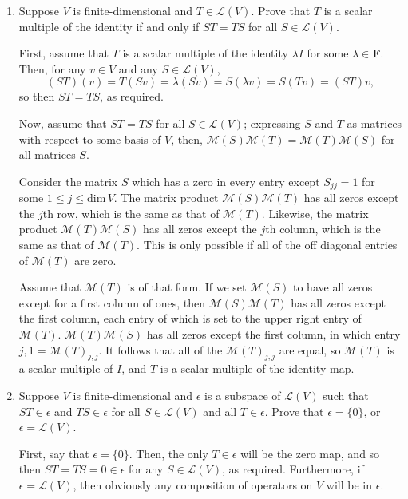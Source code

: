 \documentclass{book}
\begin{document}
\begin{enumerate}
\item Suppose \(V\) is finite-dimensional and \(T \in \mathcal{L}(V)\).  Prove that \(T\) is a scalar multiple of the identity if and only if \(ST=TS\) for all \(S \in \mathcal{L}(V)\).

First, assume that \(T\) is a scalar multiple of the identity \(\lambda I\) for some \(\lambda \in \textbf{F}\).  Then, for any \(v \in V\) and any \(S \in \mathcal{L}(V)\), \[(ST)(v)=T(Sv)=\lambda (Sv)=S(\lambda v)=S(Tv)=(ST)v,\] so then \(ST=TS\), as required.

Now, assume that \(ST=TS\) for all \(S \in \mathcal{L}(V)\); expressing \(S\) and \(T\) as matrices with respect to some basis of \(V\), then, \(\mathcal{M}(S)\mathcal{M}(T)=\mathcal{M}(T)\mathcal{M}(S)\) for all matrices \(S\).

Consider the matrix \(S\) which has a zero in every entry except \(S_{jj} = 1\) for some \(1 \leq j \leq \textrm{dim} \, V\).  The matrix product \(\mathcal{M}(S)\mathcal{M}(T)\) has all zeros except the \(j\)th row, which is the same as that of \(\mathcal{M}(T)\).  Likewise, the matrix product \(\mathcal{M}(T)\mathcal{M}(S)\) has all zeros except the \(j\)th column, which is the same as that of \(\mathcal{M}(T)\).  This is only possible if all of the off diagonal entries of \(\mathcal{M}(T)\) are zero.

Assume that \(\mathcal{M}(T)\) is of that form.  If we set \(\mathcal{M}(S)\) to have all zeros except for a first column of ones, then \(\mathcal{M}(S)\mathcal{M}(T)\) has all zeros except the first column, each entry of which is set to the upper right entry of \(\mathcal{M}(T)\).  \(\mathcal{M}(T)\mathcal{M}(S)\) has all zeros except the first column, in which entry \(j, 1 = \mathcal{M}(T)_{j,j}\).  It follows that all of the \(\mathcal{M}(T)_{j,j}\) are equal, so \(\mathcal{M}(T)\) is a scalar multiple of \(I\), and \(T\) is a scalar multiple of the identity map.

\item Suppose \(V\) is finite-dimensional and \(\epsilon\) is a subspace of \(\mathcal{L}(V)\) such that \(ST \in \epsilon\) and \(TS \in \epsilon\) for all \(S \in \mathcal{L}(V)\) and all \(T \in \epsilon\).  Prove that \(\epsilon=\{0\}\), or \(\epsilon=\mathcal{L}(V)\).

First, say that \(\epsilon = \{0\}\).  Then, the only \(T \in \epsilon\) will be the zero map, and so then \(ST=TS=0 \in \epsilon\) for any \(S \in \mathcal{L}(V)\), as required.  Furthermore, if \(\epsilon=\mathcal{L}(V)\), then obviously any composition of operators on \(V\) will be in \(\epsilon\).


\end{enumerate}
\end{document}
